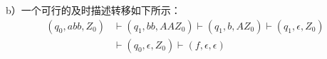 \begin{solution}
b）一个可行的及时描述转移如下所示：
\begin{align*}
    (q_0,abb,Z_0) &\vdash (q_1,bb,AAZ_0) \vdash (q_1,b,AZ_0) \vdash (q_1,\epsilon,Z_0)\\
    &\vdash (q_0,\epsilon,Z_0) \vdash (f,\epsilon,\epsilon)
\end{align*}
\end{solution}